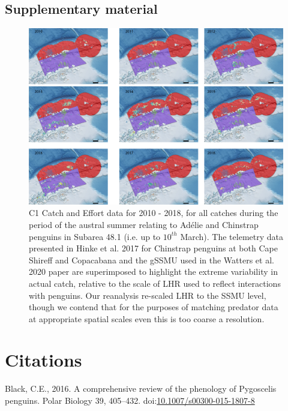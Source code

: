 \documentclass[]{elsarticle} %
\newcommand{\blandscape}{\begin{landscape}}
\newcommand{\elandscape}{\end{landscape}}
\newcommand{\beginsupplement}{\setcounter{table}{0}  \renewcommand{\thetable}{S\arabic{table}}     \setcounter{figure}{0} \renewcommand{\thefigure}{S\arabic{figure}}}
\begin{document}
\newpage
\blandscape
\beginsupplement

\hypertarget{supplementary-material}{%
\section{Supplementary material}\label{supplementary-material}}

\begin{figure}
\includegraphics[width=0.8\linewidth]{./Watters EMM figures/summer catch/Year by year catch} \caption{C1 Catch and Effort data for 2010 - 2018, for all catches during the period of the austral summer relating to Adélie and Chinstrap penguins in Subarea 48.1 (i.e. up to $10^{th}$ March).  The telemetry data presented in Hinke et al. 2017 for Chinstrap penguins at both Cape Shireff and Copacabana and the gSSMU used in the Watters et al. 2020 paper are superimposed to highlight the extreme variability in actual catch, relative to the scale of LHR used to reflect interactions with penguins.  Our reanalysis re-scaled LHR to the SSMU level, though we contend that for the purposes of matching predator data at appropriate spatial scales even this is too coarse a resolution.}\label{fig:Supplementary Figure 1}
\end{figure}
\elandscape
\newpage

\hypertarget{citations}{%
\section*{Citations}\label{citations}}

\hypertarget{refs}{}
\leavevmode\hypertarget{ref-Black2016}{}%
Black, C.E., 2016. A comprehensive review of the phenology of Pygoscelis
penguins. Polar Biology 39, 405--432.
doi:\href{https://doi.org/10.1007/s00300-015-1807-8}{10.1007/s00300-015-1807-8}
\end{document}
